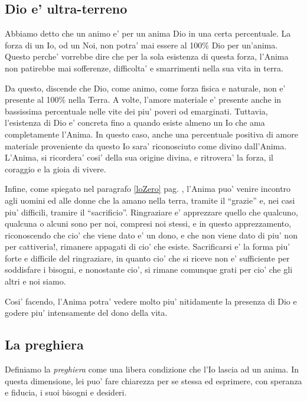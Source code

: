 \subsection{Dio e' ultra-terreno}

Abbiamo detto che un animo e' per un anima Dio in una certa percentuale. La forza di un Io, od un Noi, non potra' mai essere al 100\% Dio per un'anima. Questo perche' vorrebbe dire che per la sola esistenza di questa forza, l'Anima non patirebbe mai sofferenze, difficolta' e smarrimenti nella sua vita in terra. 

Da questo, discende che Dio, come animo, come forza fisica e naturale, non e' presente al 100\% nella Terra. A volte, l'amore materiale e' presente anche in bassissima percentuale nelle vite dei piu' poveri od emarginati. Tuttavia, l'esistenza di Dio e' concreta fino a quando esiste almeno un Io che ama completamente l'Anima. In questo caso, anche una percentuale positiva di amore materiale proveniente da questo Io sara' riconosciuto come divino dall'Anima. L'Anima, si ricordera' cosi' della sua origine divina, e ritrovera' la forza, il coraggio e la gioia di vivere.

Infine, come spiegato nel paragrafo \ref{loZero} pag. \pageref{loZero}, l'Anima puo' venire incontro agli uomini ed alle donne che la amano nella terra, tramite il ``grazie'' e, nei casi piu' difficili, tramire il ``sacrificio''. Ringraziare e' apprezzare quello che qualcuno, qualcuna o alcuni sono per noi, compresi noi stessi, e in questo apprezzamento, riconoscendo che cio' che viene dato e' un dono, e che non viene dato di piu' non per cattiveria!, rimanere appagati di cio' che esiste. Sacrificarsi e' la forma piu' forte e difficile del ringraziare, in quanto cio' che si riceve non e' sufficiente per soddisfare i bisogni, e nonostante cio', si rimane comunque grati per cio' che gli altri e noi siamo. 

Cosi' facendo, l'Anima potra' vedere molto piu' nitidamente la presenza di Dio e godere piu' intensamente del dono della vita.

\subsection{La preghiera}

Definiamo la \emph{preghiera} come una libera condizione che l'Io lascia ad un anima. In questa dimensione, lei puo' fare chiarezza per se stessa ed esprimere, con speranza e fiducia, i suoi bisogni e desideri. 

